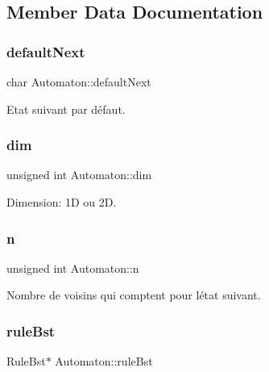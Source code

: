 \subsection{Member Data Documentation}
\mbox{\label{class_automaton_aa7894d8b17e4fe17553bca13e5b93cf5}} 
\subsubsection{\texorpdfstring{default\+Next}{defaultNext}}
{\footnotesize\ttfamily char Automaton\+::default\+Next}



Etat suivant par défaut. 

\mbox{\label{class_automaton_a69ea9d67aba5ece34636fb95de1b487f}} 
\subsubsection{\texorpdfstring{dim}{dim}}
{\footnotesize\ttfamily unsigned int Automaton\+::dim}



Dimension\+: 1D ou 2D. 

\mbox{\label{class_automaton_ac55590f74c2e26e198050887a62ec1cb}} 
\subsubsection{\texorpdfstring{n}{n}}
{\footnotesize\ttfamily unsigned int Automaton\+::n}



Nombre de voisins qui comptent pour l\textquotesingle{}état suivant. 

\mbox{\label{class_automaton_a3b344073044f20fcaba766e34ec24387}} 
\subsubsection{\texorpdfstring{rule\+Bst}{ruleBst}}
{\footnotesize\ttfamily Rule\+Bst$\ast$ Automaton\+::rule\+Bst}



